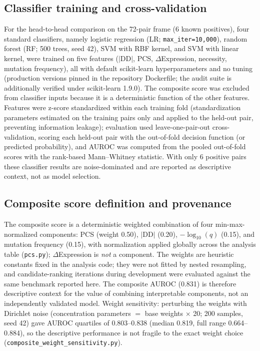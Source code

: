 \documentclass[11pt,a4paper]{article}
\begin{document}
\subsection{Classifier training and cross-validation}
For the head-to-head comparison on the 72-pair frame (6 known positives), four standard classifiers, namely logistic regression (LR; \texttt{max\_iter=10{,}000}), random forest (RF; 500 trees, seed 42), SVM with RBF kernel, and SVM with linear kernel, were trained on five features ($|$DD$|$, PCS, $\Delta$Expression, necessity, mutation frequency), all with default scikit-learn hyperparameters and no tuning (production versions pinned in the repository Dockerfile; the audit suite is additionally verified under scikit-learn 1.9.0). The composite score was excluded from classifier inputs because it is a deterministic function of the other features. Features were z-score standardized within each training fold (standardization parameters estimated on the training pairs only and applied to the held-out pair, preventing information leakage); evaluation used leave-one-pair-out cross-validation, scoring each held-out pair with the out-of-fold decision function (or predicted probability), and AUROC was computed from the pooled out-of-fold scores with the rank-based Mann--Whitney statistic. With only 6 positive pairs these classifier results are noise-dominated and are reported as descriptive context, not as model selection.

\subsection{Composite score definition and provenance}
The composite score is a deterministic weighted combination of four min-max-normalized components: PCS (weight 0.50), $|$DD$|$ (0.20), $-\log_{10}(q)$ (0.15), and mutation frequency (0.15), with normalization applied globally across the analysis table (\texttt{pcs.py}); $\Delta$Expression is \emph{not} a component. The weights are heuristic constants fixed in the analysis code; they were not fitted by nested resampling, and candidate-ranking iterations during development were evaluated against the same benchmark reported here. The composite AUROC (0.831) is therefore descriptive context for the value of combining interpretable components, not an independently validated model. Weight sensitivity: perturbing the weights with Dirichlet noise (concentration parameters $=$ base weights $\times$ 20; 200 samples, seed 42) gave AUROC quartiles of 0.803--0.838 (median 0.819, full range 0.664--0.884), so the descriptive performance is not fragile to the exact weight choice (\texttt{composite\_weight\_sensitivity.py}).
\end{document}
